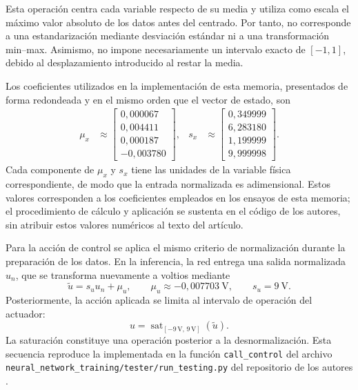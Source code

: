 Esta operación centra cada variable respecto de su media y utiliza
como escala el máximo valor absoluto de los datos antes del centrado.
Por tanto, no corresponde a una estandarización mediante desviación
estándar ni a una transformación min--max. Asimismo, no impone
necesariamente un intervalo exacto de $[-1,1]$, debido al
desplazamiento introducido al restar la media.

Los coeficientes utilizados en la implementación de esta memoria,
presentados de forma redondeada y en el mismo orden que el vector
de estado, son
\begin{align}
    \mu_x &\approx
    \begin{bmatrix}
        0{,}000067 \\
        0{,}004411 \\
        0{,}000187 \\
        -0{,}003780
    \end{bmatrix},
    &
    s_x &\approx
    \begin{bmatrix}
        0{,}349999 \\
        6{,}283180 \\
        1{,}199999 \\
        9{,}999998
    \end{bmatrix}.
\end{align}
Cada componente de $\mu_x$ y $s_x$ tiene las unidades de la variable
física correspondiente, de modo que la entrada normalizada es
adimensional. Estos valores corresponden a los coeficientes
empleados en los ensayos de esta memoria; el procedimiento de
cálculo y aplicación se sustenta en el código de los autores,
sin atribuir estos valores numéricos al texto del artículo.

Para la acción de control se aplica el mismo criterio de
normalización durante la preparación de los datos. En la inferencia,
la red entrega una salida normalizada $u_n$, que se transforma
nuevamente a voltios mediante
\begin{equation}
    \widetilde{u} = s_u u_n + \mu_u,
    \qquad
    \mu_u \approx -0{,}007703\ \mathrm{V},
    \qquad
    s_u = 9\ \mathrm{V}.
    \label{eq:desnormalizacion_control_mpc}
\end{equation}
Posteriormente, la acción aplicada se limita al intervalo de
operación del actuador:
\begin{equation}
    u = \operatorname{sat}_{[-9\,\mathrm{V},\,9\,\mathrm{V}]}
        \left(\widetilde{u}\right).
\end{equation}
La saturación constituye una operación posterior a la
desnormalización. Esta secuencia reproduce la implementada en
la función \texttt{call\_control} del archivo
\texttt{neural\_network\_training/tester/run\_testing.py}
del repositorio de los autores \cite{hoserepo}.

